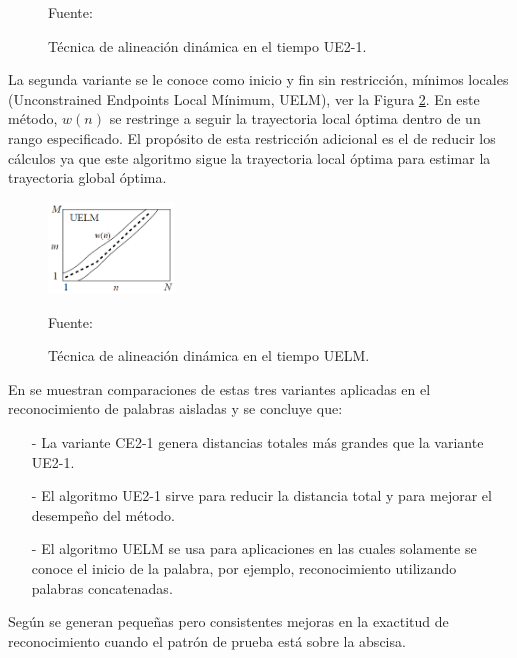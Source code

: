 \begin{enumerate}
\begin{figure}[H]
\begin{center}
\end{center}
\begin{center}
\vskip -0.5cm
\caption{\small{Técnica de alineación dinámica en el tiempo UE2-1.}}
\label{fig:figura2.50}
{\small{Fuente: \cite{rabiner}}}
\end{center}
\end{figure}
\vskip -0.5cm
La segunda variante se le conoce como inicio y fin sin restricción, mínimos locales (Unconstrained Endpoints Local Mínimum, UELM), ver la Figura \ref{fig:figura2.51}. En este método, $w(n)$ se restringe a seguir la trayectoria local óptima dentro de un rango especificado.  El propósito de esta restricción adicional es el de reducir los cálculos ya que este algoritmo sigue la trayectoria local óptima para estimar la trayectoria global óptima.
\begin{figure}[H]
\begin{center}
\includegraphics[width=0.3\textwidth]{Imagenes/Cap2/image052}
\end{center}
\begin{center}
\vskip -0.5cm
\caption{\small{Técnica de alineación dinámica en el tiempo UELM.}}
\label{fig:figura2.51}
{\small{Fuente: \cite{rabiner}}}
\end{center}
\end{figure}
\newpage
En \cite{rabiner2} se muestran comparaciones de estas tres variantes aplicadas en el reconocimiento de palabras aisladas y se concluye que:
\begin{enumerate}
\item[-]La variante CE2-1 genera distancias totales más grandes que la variante UE2-1.
\item[-]El algoritmo UE2-1 sirve para reducir la distancia total y para mejorar el desempeño del método.
\item[-]El algoritmo UELM se usa para aplicaciones en las cuales solamente se conoce el inicio de la palabra, por ejemplo, reconocimiento utilizando palabras concatenadas.
\end{enumerate}

Según \cite{rabiner3} se generan pequeñas pero consistentes mejoras en la exactitud de reconocimiento cuando el patrón de prueba está sobre la abscisa.


\end{enumerate}
